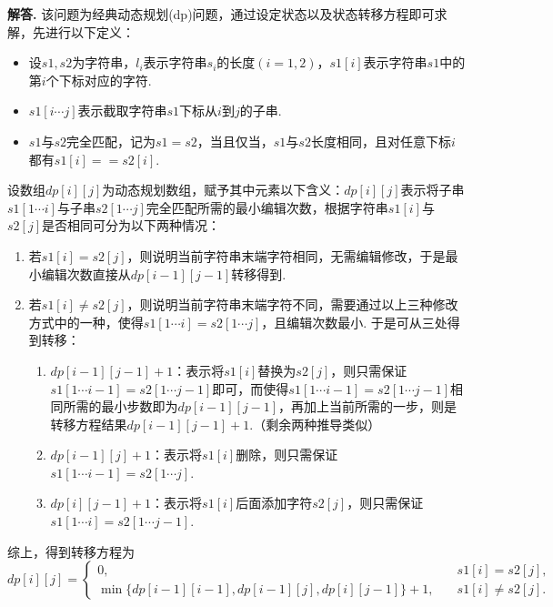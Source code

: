 \documentclass[12pt, a4paper, oneside]{ctexart}
\numberwithin{equation}{section}  %
\newenvironment{solution}[1][]{\par\noindent\textbf{#1解答. }}{\smallskip\par}  %
\begin{document}
\begin{solution}
    该问题为经典动态规划(dp)问题，通过设定状态以及状态转移方程即可求解，先进行以下定义：
    \begin{itemize}
        \item 设$s1,s2$为字符串，$l_i$表示字符串$s_i$的长度$(i=1,2)$，$s1[i]$表示字符串$s1$中的第$i$个下标对应的字符.
        \item $s1[i\cdots j]$表示截取字符串$s1$下标从$i$到$j$的子串.
        \item $s1$与$s2$完全匹配，记为$s1=s2$，当且仅当，$s1$与$s2$长度相同，且对任意下标$i$都有$s1[i] == s2[i]$.
    \end{itemize}
    
    设数组$dp[i][j]$为动态规划数组，赋予其中元素以下含义：$dp[i][j]$表示将子串$s1[1\cdots i]$与子串$s2[1\cdots j]$完全匹配所需的最小编辑次数，根据字符串$s1[i]$与$s2[j]$是否相同可分为以下两种情况：
    \begin{enumerate}
        \item 若$s1[i] = s2[j]$，则说明当前字符串末端字符相同，无需编辑修改，于是最小编辑次数直接从$dp[i-1][j-1]$转移得到.
        \item 若$s1[i]\neq s2[j]$，则说明当前字符串末端字符不同，需要通过以上三种修改方式中的一种，使得$s1[1\cdots i]=s2[1\cdots j]$，且编辑次数最小. 于是可从三处得到转移：
        \begin{enumerate}
            \item $dp[i-1][j-1]+1$：表示将$s1[i]$替换为$s2[j]$，则只需保证$s1[1\cdots i-1]=s2[1\cdots j-1]$即可，而使得$s1[1\cdots i-1]=s2[1\cdots j-1]$相同所需的最小步数即为$dp[i-1][j-1]$，再加上当前所需的一步，则是转移方程结果$dp[i-1][j-1]+1$.（剩余两种推导类似）
            \item $dp[i-1][j]+1$：表示将$s1[i]$删除，则只需保证$s1[1\cdots i-1] = s2[1\cdots j]$.
            \item $dp[i][j-1]+1$：表示将$s1[i]$后面添加字符$s2[j]$，则只需保证$s1[1\cdots i] = s2[1\cdots j-1]$.
        \end{enumerate}
    \end{enumerate}
    综上，得到转移方程为
    \begin{equation*}
        dp[i][j] = \begin{cases}
            0,&\quad s1[i] = s2[j],\\
            \min\{dp[i-1][i-1], dp[i-1][j], dp[i][j-1]\}+1,&\quad s1[i]\neq s2[j].
        \end{cases}
    \end{equation*}


\end{solution}
\end{document}
